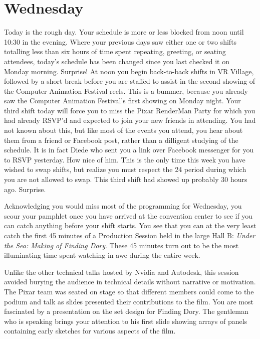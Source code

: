 \documentclass[../main.tex]{subfiles}
\begin{document}
\section{Wednesday}

Today is the rough day. Your schedule is more or less blocked from noon until 10:30 in the evening. Where your previous days saw either one or two shifts totalling less than six hours of time spent repeating, greeting, or seating attendees, today's schedule has been changed since you last checked it on Monday morning. Surprise! At noon you begin back-to-back shifts in VR Village, followed by a short break before you are staffed to assist in the second showing of the Computer Animation Festival reels. This is a bummer, because you already saw the Computer Animation Festival's first showing on Monday night. Your third shift today will force you to miss the Pixar RenderMan Party for which you had already RSVP'd and expected to join your new friends in attending. You had not known about this, but like most of the events you attend, you hear about them from a friend or Facebook post, rather than a dilligent studying of the schedule. It is in fact Diede who sent you a link over Facebook messenger for you to RSVP yesterday. How nice of him. This is the only time this week you have wished to swap shifts, but realize you must respect the 24 period during which you are not allowed to swap. This third shift had showed up probably 30 hours ago. Surprise.

Acknowledging you would miss most of the programming for Wednesday, you scour your pamphlet once you have arrived at the convention center to see if you can catch anything before your shift starts.  You see that you can at the very least catch the first 45 minutes of a Production Session held in the large Hall B: \textit{Under the Sea: Making of Finding Dory}. These 45 minutes turn out to be the most illuminating time spent watching in awe during the entire week.

Unlike the other technical talks hosted by Nvidia and Autodesk, this session avoided burying the audience in technical details without narrative or motivation. The Pixar team was seated on stage so that different members could come to the podium and talk as slides presented their contributions to the film. You are most fascinated by a presentation on the set design for Finding Dory. The gentleman who is speaking brings your attention to his first slide showing arrays of panels containing early sketches for various aspects of the film.
\end{document}
